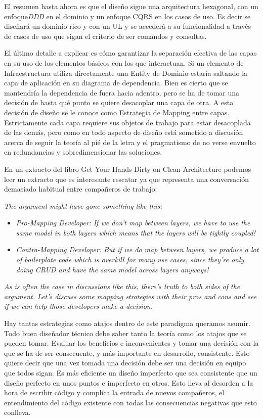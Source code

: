 El resumen hasta ahora es que el diseño sigue una arquitectura hexagonal, con un enfoque\textit{DDD} en el dominio y un enfoque CQRS en los casos de uso. Es decir se diseñará un dominio rico y con un UL y se accederá a su funcionalidad a través de casos de uso que sigan el criterio de ser comandos y consultas.

El último detalle a explicar es cómo garantizar la separación efectiva de las capas en su uso de los elementos básicos con los que interactuan. Si un elemento de Infraestructura utiliza directamente una Entity de Dominio estaría saltando la capa de aplicación en su diagrama de dependencia. Bien es cierto que se mantendría la dependencia de fuera hacia adentro, pero se ha de tomar una decisión de hasta qué punto se quiere desacoplar una capa de otra. A esta decisión de diseño se le conoce como Estrategia de Mapping entre capas. Estrictamente cada capa requiere sus objetos de trabajo para estar desacoplada de las demás, pero como en todo aspecto de diseño está sometido a discusión acerca de seguir la teoría al pié de la letra y el pragmatismo de no verse envuelto en redundancias y sobredimensionar las soluciones.

En un extracto del libro Get Your Hands Dirty on Clean Architecture\cite{TomHombergs2019GYHD} podemos leer un extracto que es interesante rescatar ya que representa una conversación demasiado habitual entre compañeros de trabajo:

\textit{ The argument might have gone something like this:}

\begin{itemize}
    \item \textit{Pro-Mapping Developer:}
    \subitem  \textit{ If we don’t map between layers, we have to use the same model in both layers which means that the layers will be tightly coupled!}
    \item \textit{Contra-Mapping Developer:}
    \subitem \textit{ But if we do map between layers, we produce a lot of boilerplate code which is overkill for many use cases, since they’re only doing CRUD and have the same model across layers anyways!}
\end{itemize}
\textit{As is often the case in discussions like this, there’s truth to both sides of the argument. Let’s discuss some mapping strategies with their pros and cons and see if we can help those developers make a decision.}

Hay tantas estrategias como atajos dentro de este paradigma queramos asumir. Todo buen diseñador técnico debe saber tanto la teoría como los atajos que se pueden tomar. Evaluar los beneficios e inconvenientes y tomar una decisión con la que se ha de ser consecuente, y más importante en desarrollo, consistente. Esto quiere decir que una vez tomada una decisión debe ser una decisión en equipo que todos sigan. Es más eficiente un diseño imperfecto que sea consistente que un diseño perfecto en unos puntos e imperfecto en otros. Esto lleva al desorden a la hora de escribir código y complica la entrada de nuevos compañeros, el entendimiento del código existente con todas las consecuencias negativas que esto conlleva.


